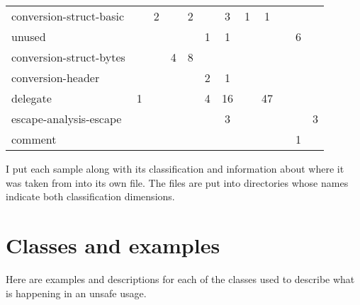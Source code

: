 \begin{table}[h]
\begin{tabularx}{\textwidth}{Xccccccccccc}
                  conversion-struct-basic &       &              2 &            &             2 &       &      3 &   1 &          1 &             &        &                        \\
        \rowcolor{verylightgray}
                                   unused &       &                &            &               &     1 &      1 &     &            &             &      6 &                        \\
                  conversion-struct-bytes &       &                &          4 &             8 &       &        &     &            &             &        &                        \\
        \rowcolor{verylightgray}
                        conversion-header &       &                &            &               &     2 &      1 &     &            &             &        &                        \\
                                 delegate &     1 &                &            &               &     4 &     16 &     &         47 &             &        &                        \\
        \rowcolor{verylightgray}
                   escape-analysis-escape &       &                &            &               &       &      3 &     &            &             &        &                      3 \\
                                  comment &       &                &            &               &       &        &     &            &             &      1 &                        \\
        \bottomrule
    \end{tabularx}
\end{table}

I put each sample along with its classification and information about where it was taken from into its own file.
The files are put into directories whose names indicate both classification dimensions.



\section{Classes and examples}\label{sec:survey-small-classes}

Here are examples and descriptions for each of the classes used to describe what is happening in an unsafe usage.

